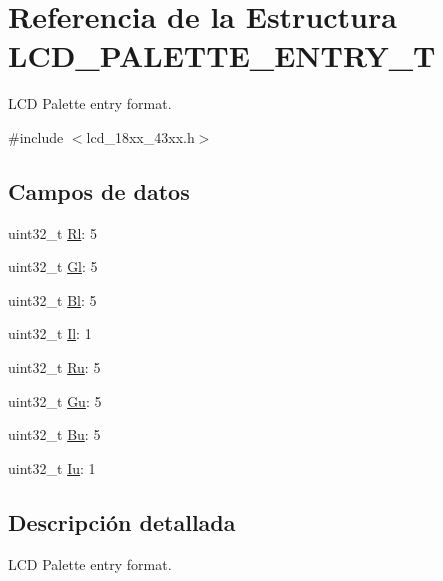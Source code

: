 \hypertarget{struct_l_c_d___p_a_l_e_t_t_e___e_n_t_r_y___t}{}\section{Referencia de la Estructura L\+C\+D\+\_\+\+P\+A\+L\+E\+T\+T\+E\+\_\+\+E\+N\+T\+R\+Y\+\_\+T}
\label{struct_l_c_d___p_a_l_e_t_t_e___e_n_t_r_y___t}


L\+CD Palette entry format.  




{\ttfamily \#include $<$lcd\+\_\+18xx\+\_\+43xx.\+h$>$}

\subsection*{Campos de datos}
\begin{DoxyCompactItemize}
\item 
uint32\+\_\+t \hyperlink{struct_l_c_d___p_a_l_e_t_t_e___e_n_t_r_y___t_a45ff0da2c14147cd867331fe71d2cb3e}{Rl}\+: 5
\item 
uint32\+\_\+t \hyperlink{struct_l_c_d___p_a_l_e_t_t_e___e_n_t_r_y___t_ac2ef5652c3036f4e2e6726827358ce36}{Gl}\+: 5
\item 
uint32\+\_\+t \hyperlink{struct_l_c_d___p_a_l_e_t_t_e___e_n_t_r_y___t_a02ab190a2cbb91b6f1b4d157bbacf3a9}{Bl}\+: 5
\item 
uint32\+\_\+t \hyperlink{struct_l_c_d___p_a_l_e_t_t_e___e_n_t_r_y___t_ad84ec1984fc01412c8b23c488a1c6e34}{Il}\+: 1
\item 
uint32\+\_\+t \hyperlink{struct_l_c_d___p_a_l_e_t_t_e___e_n_t_r_y___t_af589bfb5be8a0fd514d90788c5b3c839}{Ru}\+: 5
\item 
uint32\+\_\+t \hyperlink{struct_l_c_d___p_a_l_e_t_t_e___e_n_t_r_y___t_a5c500dbd0da9c6dee01113a75681c8e6}{Gu}\+: 5
\item 
uint32\+\_\+t \hyperlink{struct_l_c_d___p_a_l_e_t_t_e___e_n_t_r_y___t_ae4d6ee4f473f96371659cac879e0ebec}{Bu}\+: 5
\item 
uint32\+\_\+t \hyperlink{struct_l_c_d___p_a_l_e_t_t_e___e_n_t_r_y___t_a4b21dc5839317ff52328d54c8c162728}{Iu}\+: 1
\end{DoxyCompactItemize}


\subsection{Descripción detallada}
L\+CD Palette entry format. 

